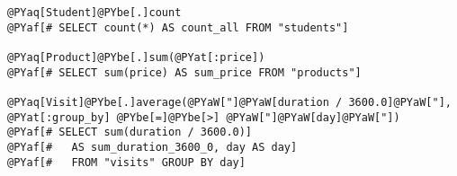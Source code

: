 \begin{Verbatim}[commandchars=@\[\]]
@PYaq[Student]@PYbe[.]count
@PYaf[# SELECT count(*) AS count_all FROM "students"]

@PYaq[Product]@PYbe[.]sum(@PYat[:price])
@PYaf[# SELECT sum(price) AS sum_price FROM "products"]

@PYaq[Visit]@PYbe[.]average(@PYaW["]@PYaW[duration / 3600.0]@PYaW["], @PYat[:group_by] @PYbe[=]@PYbe[>] @PYaW["]@PYaW[day]@PYaW["])
@PYaf[# SELECT sum(duration / 3600.0)]
@PYaf[#   AS sum_duration_3600_0, day AS day]
@PYaf[#   FROM "visits" GROUP BY day]
\end{Verbatim}
